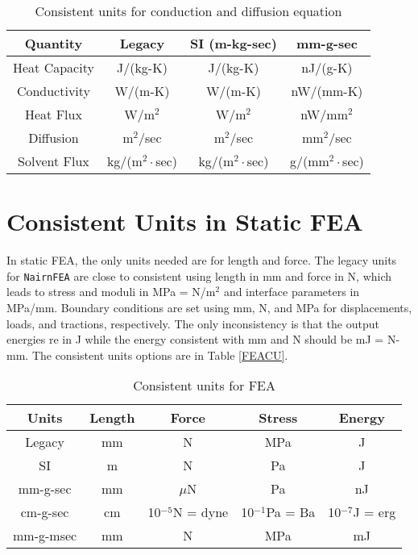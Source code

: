 \documentclass[11pt]{article}
\begin{document}
\begin{table}
\caption{Consistent units for conduction and diffusion equation \label{MPMCUT}}
\begin{center}
\begin{tabular}{||c||c||c|c||}
\hline
Quantity & Legacy & SI (m-kg-sec) & mm-g-sec  \\
\hline
Heat Capacity & J/(kg-K) & J/(kg-K) & nJ/(g-K)  \\
Conductivity & W/(m-K) & W/(m-K) & nW/(mm-K)  \\
Heat Flux & W/m$^2$ & W/m$^2$ & nW/mm$^2$ \\
Diffusion & m$^2$/sec & m$^2$/sec  & mm$^2$/sec   \\
Solvent Flux & kg/(m$^2\cdot$sec) & kg/(m$^2\cdot$sec) & g/(mm$^2\cdot$sec) \\
\hline
\end{tabular}
\end{center}
\label{units}
\end{table}

\section{Consistent Units in Static FEA}

In static FEA, the only units needed are for length and force. The legacy units for {\tt NairnFEA} are close to consistent using length in mm and force in N, which leads to stress and moduli in MPa = N/m$^2$ and interface parameters in MPa/mm. Boundary conditions are set using mm, N, and MPa for displacements, loads, and tractions, respectively. The only inconsistency is that the output energies re in J while the energy consistent with mm and N should be mJ = N-mm. The consistent units options are in Table \ref{FEACU}.

\begin{table}
\caption{Consistent units for FEA \label{FEACU}}
\begin{center}
\begin{tabular}{|c|c|c|c|c|}
\hline
Units & Length & Force & Stress & Energy \\
\hline
Legacy & mm & N & MPa & J \\
SI & m & N & Pa & J \\
mm-g-sec & mm & $\mu$N & Pa & nJ \\
cm-g-sec & cm & 10$^{-5}$N = dyne & 10$^{-1}$Pa = Ba & 10$^{-7}$J = erg \\
mm-g-msec & mm & N & MPa & mJ \\
\hline
\end{tabular}
\end{center}
\label{units}
\end{table}
\end{document}
